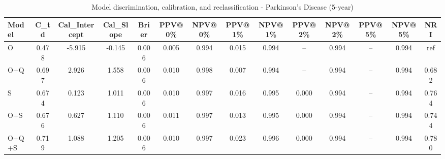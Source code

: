 \begin{table}[htbp]
\centering
\small
\caption{Model discrimination, calibration, and reclassification - Parkinson's Disease (5-year)}
\label{tab:perf_pd_5y}
\begin{tabular}{lccccccccccccc}
\toprule
Model & C\_td & Cal\_Intercept & Cal\_Slope & Brier & PPV@0\% & NPV@0\% & PPV@1\% & NPV@1\% & PPV@2\% & NPV@2\% & PPV@5\% & NPV@5\% & NRI \\
\midrule
O & 0.478 & -5.915 & -0.145 & 0.006 & 0.005 & 0.994 & 0.015 & 0.994 & -- & 0.994 & -- & 0.994 & ref \\
O+Q & 0.697 & 2.926 & 1.558 & 0.006 & 0.010 & 0.998 & 0.007 & 0.994 & -- & 0.994 & -- & 0.994 & 0.682 \\
S & 0.674 & 0.123 & 1.011 & 0.006 & 0.010 & 0.997 & 0.016 & 0.995 & 0.000 & 0.994 & -- & 0.994 & 0.764 \\
O+S & 0.676 & 0.627 & 1.110 & 0.006 & 0.011 & 0.997 & 0.013 & 0.995 & 0.000 & 0.994 & -- & 0.994 & 0.744 \\
O+Q+S & 0.719 & 1.088 & 1.205 & 0.006 & 0.010 & 0.997 & 0.023 & 0.996 & 0.000 & 0.994 & -- & 0.994 & 0.780 \\
\bottomrule
\end{tabular}
\end{table}
